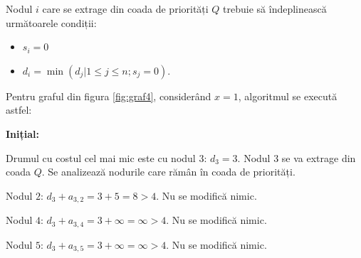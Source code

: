 \documentclass[9pt,a4paper]{report}
\begin{document}
Nodul $i$ care se extrage din coada de priorități $Q$ trebuie să îndeplinească următoarele condiții:
\begin{itemize}
    \item $s_i = 0$
    \item $d_i = \min{(d_j | 1 \leq j \leq n; s_j = 0)}$.
\end{itemize}

Pentru graful din figura \ref{fig:graf4}, considerând $x = 1$, algoritmul se execută astfel:

\textbf{Inițial:}
\begin{center}
\end{center}

Drumul cu costul cel mai mic este cu nodul $3$: $d_3 = 3$. Nodul $3$ se va extrage din coada $Q$. Se analizează nodurile care rămân în coada de priorități.

Nodul $2$: $d_3 + a_{3,2} = 3 + 5 = 8 > 4$. Nu se modifică nimic.

Nodul $4$: $d_3 + a_{3,4} = 3 + \infty = \infty > 4$. Nu se modifică nimic.

Nodul $5$: $d_3 + a_{3,5} = 3 + \infty = \infty > 4$. Nu se modifică nimic.
\end{document}
